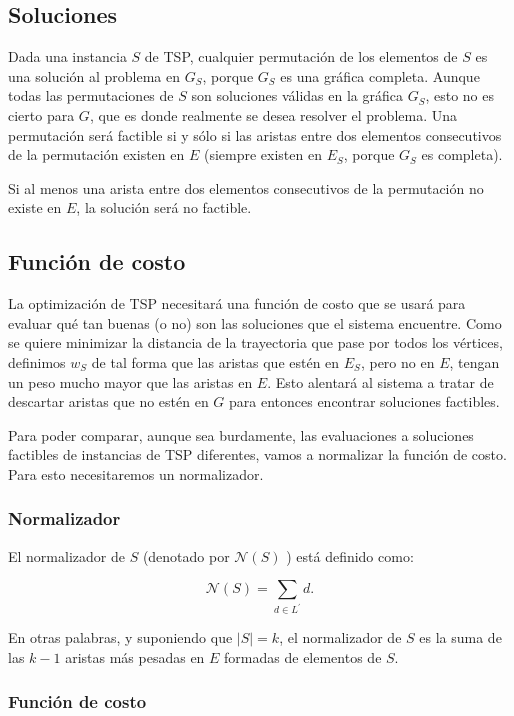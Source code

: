\documentclass[spanish,12pt,letterpaper]{article}
\begin{document}
	
	\subsection{Soluciones}
	
	Dada una instancia $S$ de TSP, cualquier permutación de los elementos de $S$ es una solución al problema en $G_{S}$, porque $G_{S}$ es una gráfica completa.
	Aunque todas las permutaciones de $S$ son soluciones válidas en la gráfica $G_{S}$, esto no es cierto para $G$, que es donde realmente se desea resolver el problema. Una permutación será factible si y sólo si las aristas entre dos elementos consecutivos de la permutación existen en $E$ (siempre existen en $E_{S}$, porque $G_{S}$ es completa).
	
	Si al menos una arista entre dos elementos consecutivos de la permutación no existe en $E$, la solución será no factible.
	
	\subsection{Función de costo}
	
	La optimización de TSP necesitará una función de costo que se usará para evaluar qué tan buenas (o no) son las soluciones que el sistema encuentre. Como se quiere minimizar la distancia de la trayectoria que pase por todos los vértices, definimos $w_{S}$ de tal forma que las aristas que estén en $E_{S}$, pero no en $E$, tengan un peso mucho mayor que las aristas en $E$. Esto alentará al sistema a tratar de descartar aristas que no estén en $G$ para entonces encontrar soluciones factibles.
	
	Para poder comparar, aunque sea burdamente, las evaluaciones a soluciones factibles de instancias de TSP diferentes, vamos a normalizar la función de costo. Para esto necesitaremos un normalizador.
	
	\subsubsection{Normalizador}
	El normalizador de $S$ (denotado por $\mathscr{N}(S)$ ) está definido como:
	
	\[
	\mathscr{N}(S)=\sum_{d \in L^{\prime}} d .
	\]
	
	En otras palabras, y suponiendo que $|S|=k$, el normalizador de $S$ es la suma de las $k-1$ aristas más pesadas en $E$ formadas de elementos de $S$.
	
	\subsubsection{Función de costo}
	
\end{document}
